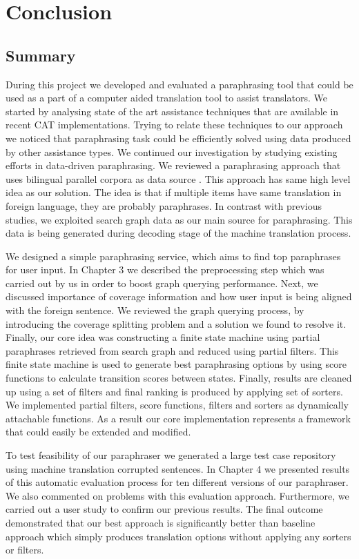 
\chapter{Conclusion}

\section{Summary}

During this project we developed and evaluated a paraphrasing tool that could be used as a part of a computer aided translation tool to assist translators. We started by analysing state of the art assistance techniques that are available in recent CAT implementations. Trying to relate these techniques to our approach we noticed that paraphrasing task could be efficiently solved using data produced by other assistance types. We continued our investigation by studying existing efforts in data-driven paraphrasing. We reviewed a paraphrasing approach that uses bilingual parallel corpora as data source \citep{Callison-Burch2007}. This approach has same high level idea as our solution. The idea is that if multiple items have same translation in foreign language, they are probably paraphrases. In contrast with previous studies, we exploited search graph data as our main source for paraphrasing. This data is being generated during decoding stage of the machine translation process.

We designed a simple paraphrasing service, which aims to find top paraphrases for user input. In Chapter 3 we described the preprocessing step which was carried out by us in order to boost graph querying performance. Next, we discussed importance of coverage information and how user input is being aligned with the foreign sentence. We reviewed the graph querying process, by introducing the coverage splitting problem and a solution we found to resolve it. Finally, our core idea was constructing a finite state machine using partial paraphrases retrieved from search graph and reduced using partial filters. This finite state machine is used to generate best paraphrasing options by using score functions to calculate transition scores between states. Finally, results are cleaned up using a set of filters and final ranking is produced by applying set of sorters. We implemented partial filters, score functions, filters and sorters as dynamically attachable functions. As a result our core implementation represents a framework that could easily be extended and modified. 

To test feasibility of our paraphraser we generated a large test case repository using machine translation corrupted sentences. In Chapter 4 we presented results of this automatic evaluation process for ten different versions of our paraphraser. We also commented on problems with this evaluation approach. Furthermore, we carried out a user study to confirm our previous results. The final outcome demonstrated that our best approach is significantly better than baseline approach which simply produces translation options without applying any sorters or filters.

